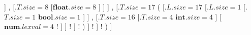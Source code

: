 \Tree	[.{$T.size = 29$} {(} %
			[.{$L.size = 29$} %
				[.{$L.size = 12$} %
					[.{$L.size = 4$} [.{$T.size = 4$} {$\mathbf{int}.size = 4$} ] %
					]
				{,}
					[.{$T.size = 8$}
						[{$\mathbf{float}.size = 8$} ]
					] %
				]
			{,}
				[.{$T.size = 17$}  %
				{(}
					[.{$L.size = 17$} %
						[.{$L.size = 1$}  %
							[.{$T.size = 1$} {$\mathbf{bool}.size = 1$} %
							]
						]
					{,}
						[.{$T.size = 16$} %
							[.{$T.size = 4$} {$\mathbf{int}.size = 4$} ] %
						{[}
						{$\mathbf{num}.lexval = 4$}
						!\qsetw{2.5cm} %
						{]}
						] !\qsetw{4.5cm} %
					 ] !\qsetw{2.5cm} %
				 {)}
				]  !\qsetw{2.5cm} %
			] !\qsetw{2.5cm} %
		 {)}
		 ]
